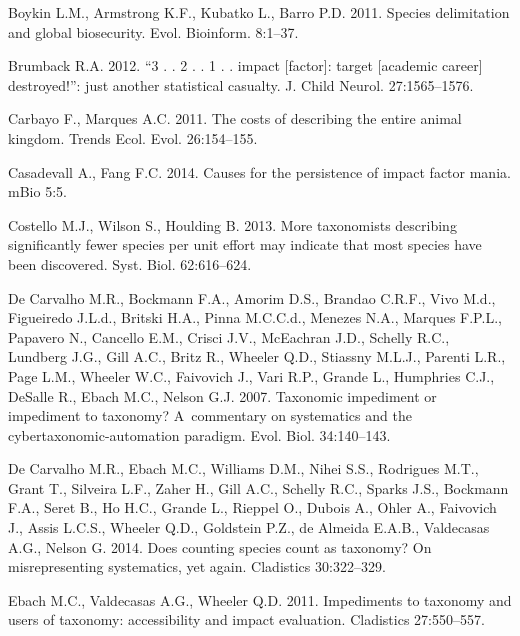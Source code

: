 \documentclass[webpdf,PV,mynatbib,surname,CE,MSC]{SYS-PV}
\begin{document}
\begin{thebibliography}{}
Boykin L.M., Armstrong K.F., Kubatko L., Barro P.D. 2011. Species delimitation and global
biosecurity. Evol. Bioinform. 8:1--37.

Brumback R.A. 2012. ``3 . . 2 . . 1 . . impact [factor]: target [academic career] destroyed!'':
just another statistical casualty. J. Child Neurol. 27:1565--1576.

Carbayo F., Marques A.C. 2011. The costs of describing the entire animal kingdom. Trends Ecol.
Evol. 26:154--155.

Casadevall A., Fang F.C. 2014. Causes for the persistence of impact factor mania. mBio 5:5.

Costello M.J., Wilson S., Houlding B. 2013. More taxonomists describing significantly fewer
species per unit effort may indicate that most species have been discovered. Syst. Biol.
62:616--624.

De Carvalho M.R., Bockmann F.A., Amorim D.S., Brandao C.R.F., Vivo M.d., Figueiredo J.L.d.,
Britski H.A., Pinna M.C.C.d., Menezes N.A., Marques F.P.L., Papavero N., Cancello E.M., Crisci
J.V., McEachran J.D., Schelly R.C., Lundberg J.G., Gill A.C., Britz R., Wheeler Q.D., Stiassny
M.L.J., Parenti L.R., Page L.M., Wheeler W.C., Faivovich J., Vari R.P., Grande L., Humphries C.J.,
DeSalle R., Ebach M.C., Nelson G.J. 2007. Taxonomic impediment or impediment to taxonomy?
A~commentary on systematics and the cybertaxonomic-automation paradigm. Evol. Biol. 34:140--143.

De Carvalho M.R., Ebach M.C., Williams D.M., Nihei S.S., Rodrigues M.T., Grant T., Silveira L.F.,
Zaher H., Gill A.C., Schelly R.C., Sparks J.S., Bockmann F.A., Seret B., Ho H.C., Grande L.,
Rieppel O., Dubois A., Ohler A., Faivovich J., Assis L.C.S., Wheeler Q.D., Goldstein P.Z., de
Almeida E.A.B., Valdecasas A.G., Nelson G. 2014. Does counting species count as taxonomy? On
misrepresenting systematics, yet again. Cladistics 30:322--329.

Ebach M.C., Valdecasas A.G., Wheeler Q.D. 2011. Impediments to taxonomy and users of taxonomy:
accessibility and impact evaluation. Cladistics 27:550--557.


\end{thebibliography}
\end{document}
